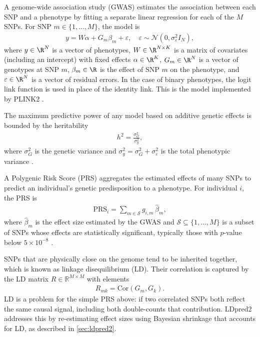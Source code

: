 A genome-wide association study (GWAS) estimates the association between each SNP and a phenotype by fitting a separate linear regression for each of the $M$ SNPs. For SNP $m \in \{1, \dots, M\}$, the model is
\begin{align} \label{eq:gwas_fixed}
    y = W\alpha + G_m \beta_m + \varepsilon, \quad \varepsilon \sim \mathcal{N}(0, \sigma_\varepsilon^2 I_N),
\end{align}
where $y \in \R^N$ is a vector of phenotypes, $W \in \R^{N \times K}$ is a matrix of covariates (including an intercept) with fixed effects $\alpha \in \R^K$, $G_m \in \R^N$ is a vector of genotypes at SNP $m$, $\beta_m \in \R$ is the effect of SNP $m$ on the phenotype, and $\varepsilon \in \R^N$ is a vector of residual errors. In the case of binary phenotypes, the logit link function is used in place of the identity link. This is the model implemented by PLINK2 \citep{Chang2015, Uffelmann2021}.

The maximum predictive power of any model based on additive genetic effects is bounded by the heritability
\begin{align*}
    h^2 = \frac{\sigma_G^2}{\sigma_y^2},
\end{align*}
where $\sigma_G^2$ is the genetic variance and $\sigma_y^2 = \sigma_G^2 + \sigma_\varepsilon^2$ is the total phenotypic variance \citep{Zaitlen2012}.

A Polygenic Risk Score (PRS) aggregates the estimated effects of many SNPs to predict an individual's genetic predisposition to a phenotype. For individual $i$, the PRS is
\begin{align*}
\text{PRS}_i = \sum_{m \in \mathcal{S}} g_{i,m}\, \hat{\beta}_m,
\end{align*}
where $\hat{\beta}_m$ is the effect size estimated by the GWAS and $\mathcal{S} \subseteq \{1, \dots, M\}$ is a subset of SNPs whose effects are statistically significant, typically those with $p$-value below $5 \times 10^{-8}$ \citep{Uffelmann2021}.

SNPs that are physically close on the genome tend to be inherited together, which is known as linkage disequilibrium (LD). Their correlation is captured by the LD matrix $R \in \mathbb{R}^{M \times M}$ with elements
\begin{align*}
R_{mk} = \text{Cor}(G_m, G_k).
\end{align*}
LD is a problem for the simple PRS above: if two correlated SNPs both reflect the same causal signal, including both double-counts that contribution. LDpred2 \citep{Prive2020} addresses this by re-estimating effect sizes using Bayesian shrinkage that accounts for LD, as described in \autoref{sec:ldpred2}.


